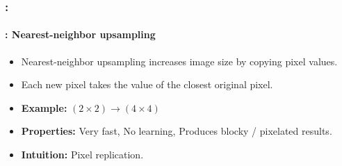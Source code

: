 \documentclass[xcolor=table]{beamer}
\begin{document}
\begin{frame}
	\frametitle{\insertshortsubtitle: \insertsection}
	\framesubtitle{\insertsubsection: Nearest-neighbor upsampling}
	
	\begin{itemize}
		
		\item Nearest-neighbor upsampling increases image size by copying pixel values.
		
		\item Each new pixel takes the value of the closest original pixel.
		
		\item \textbf{Example:}	$(2 \times 2) \rightarrow (4 \times 4)$
		
		\item \textbf{Properties:} Very fast, No learning, Produces blocky / pixelated results.
		
		\item \textbf{Intuition:} Pixel replication.
		
	\end{itemize}
	
	\begin{center}
	\end{center}
	
\end{frame}
\end{document}
